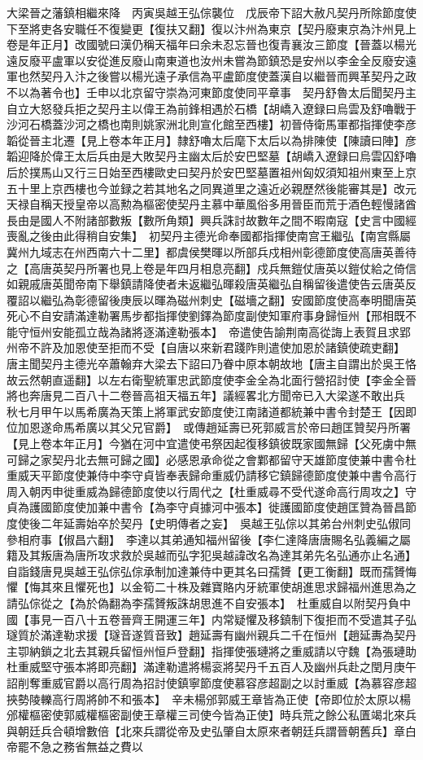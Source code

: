 大梁晉之藩鎮相繼來降　丙寅吳越王弘倧襲位　戊辰帝下詔大赦凡契丹所除節度使下至將吏各安職任不復變更【復扶又翻】復以汴州為東京【契丹廢東京為汴州見上卷是年正月】改國號曰漢仍稱天福年曰余未忍忘晉也復青襄汝三節度【晉蓋以楊光遠反廢平盧軍以安從進反廢山南東道也汝州未嘗為節鎮恐是安州以李金全反廢安遠軍也然契丹入汴之後嘗以楊光遠子承信為平盧節度使蓋漢自以繼晉而興革契丹之政不以為著令也】壬申以北京留守崇為河東節度使同平章事　契丹舒魯太后聞契丹主自立大怒發兵拒之契丹主以偉王為前鋒相遇於石橋【胡嶠入遼録曰烏雲及舒嚕戰于沙河石橋蓋沙河之橋也南則姚家洲北則宣化館至西樓】初晉侍衛馬軍都指揮使李彦韜從晉主北遷【見上卷本年正月】隸舒嚕太后麾下太后以為排陳使【陳讀曰陣】彦韜迎降於偉王太后兵由是大敗契丹主幽太后於安巴堅墓【胡嶠入遼録曰烏雲囚舒嚕后於撲馬山又行三日始至西樓歐史曰契丹於安巴堅墓置祖州匈奴須知祖州東至上京五十里上京西樓也今並録之若其地名之同異道里之遠近必親歷然後能審其是】改元天禄自稱天授皇帝以高勲為樞密使契丹主慕中華風俗多用晉臣而荒于酒色輕慢諸酋長由是國人不附諸部數叛【數所角類】興兵誅討故數年之間不暇南寇【史言中國經喪亂之後由此得稍自安集】　初契丹主德光命奉國都指揮使南宫王繼弘【南宫縣屬冀州九域志在州西南六十二里】都虞侯樊暉以所部兵戍相州彰德節度使高唐英善待之【高唐英契丹所署也見上卷是年四月相息亮翻】戍兵無鎧仗唐英以鎧仗給之倚信如親戚唐英聞帝南下舉鎮請降使者未返繼弘暉殺唐英繼弘自稱留後遣使告云唐英反覆詔以繼弘為彰德留後庚辰以暉為磁州刺史【磁墻之翻】安國節度使高奉明聞唐英死心不自安請滿達勒署馬步都指揮使劉鐸為節度副使知軍府事身歸恒州【邢相既不能守恒州安能孤立哉為諸將逐滿達勒張本】　帝遣使告諭荆南高從誨上表賀且求郢州帝不許及加恩使至拒而不受【自唐以來新君踐阼則遣使加恩於諸鎮使疏吏翻】　唐主聞契丹主德光卒蕭翰弃大梁去下詔曰乃眷中原本朝故地【唐主自謂出於吳王恪故云然朝直遥翻】以左右衛聖統軍忠武節度使李金全為北面行營招討使【李金全晉將也奔唐見二百八十二卷晉高祖天福五年】議經畧北方聞帝已入大梁遂不敢出兵　秋七月甲午以馬希廣為天策上將軍武安節度使江南諸道都統兼中書令封楚王【因即位加恩遂命馬希廣以其父兄官爵】　或傳趙延壽已死郭威言於帝曰趙匡贊契丹所署【見上卷本年正月】今猶在河中宜遣使弔祭因起復移鎮彼既家國無歸【父死虜中無可歸之家契丹北去無可歸之國】必感恩承命從之會鄴都留守天雄節度使兼中書令杜重威天平節度使兼侍中李守貞皆奉表歸命重威仍請移它鎮歸德節度使兼中書令高行周入朝丙申徙重威為歸德節度使以行周代之【杜重威尋不受代遂命高行周攻之】守貞為護國節度使加兼中書令【為李守貞據河中張本】徙護國節度使趙匡贊為晉昌節度使後二年延壽始卒於契丹【史明傳者之妄】　吳越王弘倧以其弟台州刺史弘俶同參相府事【俶昌六翻】　李達以其弟通知福州留後【李仁達降唐唐賜名弘義編之屬籍及其叛唐為唐所攻求救於吳越而弘字犯吳越諱改名為達其弟先名弘通亦止名通】自詣錢唐見吳越王弘倧弘倧承制加達兼侍中更其名曰孺贇【更工衡翻】既而孺贇悔懼【悔其來且懼死也】以金筍二十株及雜寶賂内牙統軍使胡進思求歸福州進思為之請弘倧從之【為於偽翻為李孺贇叛誅胡思進不自安張本】　杜重威自以附契丹負中國【事見一百八十五卷晉齊王開運三年】内常疑懼及移鎮制下復拒而不受遣其子弘璲質於滿達勒求援【璲音遂質音致】趙延壽有幽州親兵二千在恒州【趙延夀為契丹主卾納鎖之北去其親兵留恒州恒戶登翻】指揮使張璉將之重威請以守魏【為張璉助杜重威堅守張本將即亮翻】滿達勒遣將楊衮將契丹千五百人及幽州兵赴之閏月庚午詔削奪重威官爵以高行周為招討使鎮寧節度使慕容彦超副之以討重威【為慕容彦超挾勢陵轢高行周將帥不和張本】　辛未楊邠郭威王章皆為正使【帝即位於太原以楊邠權樞密使郭威權樞密副使王章權三司使今皆為正使】時兵荒之餘公私匱竭北來兵與朝廷兵合頓增數倍【北來兵謂從帝及史弘肇自太原來者朝廷兵謂晉朝舊兵】章白帝罷不急之務省無益之費以